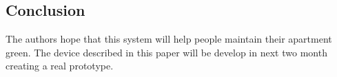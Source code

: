 \documentclass[conference]{IEEEtran}
\begin{document}

 








\endgroup





\begin{flushleft}
	
\section{Conclusion}
	The authors hope that this system will help people maintain their apartment green.
	The device described in this paper will be develop in  next two month creating a real prototype.
\end{flushleft}
\end{document}
